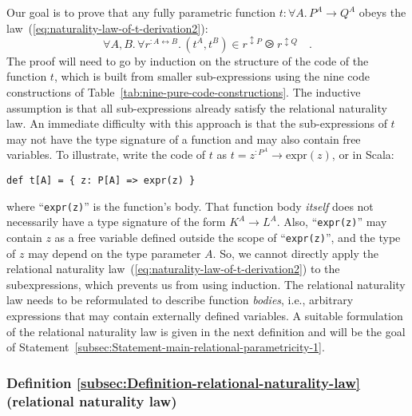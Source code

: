 Our goal is to prove that any fully parametric function $t:\forall A.\,P^{A}\rightarrow Q^{A}$
obeys the law~(\ref{eq:naturality-law-of-t-derivation2}):
\[
\forall A,B.\,\forall r^{:A\leftrightarrow B}.\,(t^{A},t^{B})\in r^{\updownarrow P}\ogreaterthan r^{\updownarrow Q}\quad.
\]
The proof will need to go by induction on the structure of the code
of the function $t$, which is built from smaller sub-expressions
using the nine code constructions of Table~\ref{tab:nine-pure-code-constructions}.
The inductive assumption is that all sub-expressions already satisfy
the relational naturality law. An immediate difficulty with this approach
is that the sub-expressions of $t$ may not have the type signature
of a function and may also contain free variables. To illustrate,
write the code of $t$ as $t=z^{:P^{A}}\rightarrow\text{expr}(z)$,
or in Scala:
\begin{lstlisting}
def t[A] = { z: P[A] => expr(z) }
\end{lstlisting}
where \textsf{``}\lstinline!expr(z)!\textsf{''} is the function\textsf{'}s body. That function
body \emph{itself} does not necessarily have a type signature of the
form $K^{A}\rightarrow L^{A}$. Also, \textsf{``}\lstinline!expr(z)!\textsf{''} may
contain $z$ as a free variable defined outside the scope of \textsf{``}\lstinline!expr(z)!\textsf{''},
and the type of $z$ may depend on the type parameter $A$. So, we
cannot directly apply the relational naturality law~(\ref{eq:naturality-law-of-t-derivation2})
to the subexpressions, which prevents us from using induction. The
relational naturality law needs to be reformulated to describe function
\emph{bodies}, i.e., arbitrary expressions that may contain externally
defined variables. A suitable formulation of the relational naturality
law is given in the next definition and will be the goal of Statement~\ref{subsec:Statement-main-relational-parametricity-1}.

\subsubsection{Definition \label{subsec:Definition-relational-naturality-law}\ref{subsec:Definition-relational-naturality-law}
(relational naturality law)}

